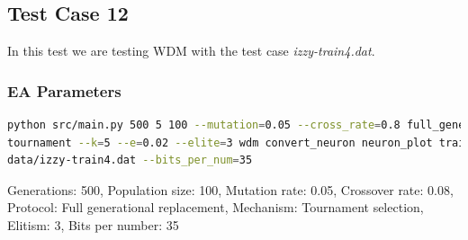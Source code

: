 \subsection{Test Case 12}\label{sec:test-case-12}
In this test we are testing WDM with the test case
\textit{izzy-train4.dat}.
\subsubsection{EA Parameters}\label{sec:test-case-12-parameters}
\begin{lstlisting}[frame=single, language=bash, caption=Command-line to
replicate the results]
python src/main.py 500 5 100 --mutation=0.05 --cross_rate=0.8 full_generational
tournament --k=5 --e=0.02 --elite=3 wdm convert_neuron neuron_plot training\
data/izzy-train4.dat --bits_per_num=35
\end{lstlisting}
Generations: 500, Population size: 100, Mutation rate: 0.05, Crossover rate: 0.08, Protocol: Full generational replacement, Mechanism: Tournament selection, Elitism: 3, Bits per number: 35
